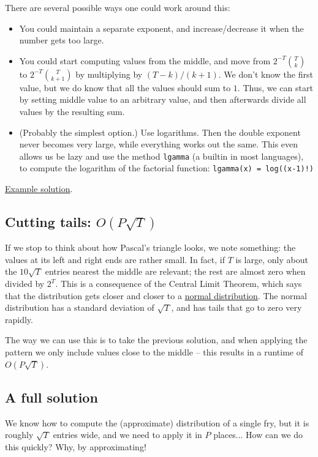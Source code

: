 \documentclass{article}
\begin{document}
There are several possible ways one could work around this:

\begin{itemize}
  \item You could maintain a separate exponent, and increase/decrease it when the number gets too large.
  \item You could start computing values from the middle, and move from $2^{-T}\binom{T}{k}$ to $2^{-T}\binom{T}{k+1}$
    by multiplying by $(T-k)/(k+1)$. We don't know the first value, but we do know that all the values should sum to $1$.
    Thus, we can start by setting middle value to an arbitrary value, and then afterwards divide all values by the resulting sum.
  \item (Probably the simplest option.) Use logarithms.
    Then the double exponent never becomes very large, while everything works out the same.
    This even allows us be lazy and use the method \texttt{lgamma} (a builtin in most languages),
    to compute the logarithm of the factorial function: \texttt{lgamma(x) = log((x-1)!)}
\end{itemize}

\href{https://github.com/nordicolympiad/nordic-olympiad-2018/blob/master/tasks/fries/submissions/precompute_sl.cpp}{Example solution}.

\subsection*{Cutting tails: $O(P\sqrt T)$}
If we stop to think about how Pascal's triangle looks, we note something: the values at its left and right ends are rather small.
In fact, if $T$ is large, only about the $10 \sqrt T$ entries nearest the middle are relevant; the rest are almost zero when divided by $2^T$.
This is a consequence of the Central Limit Theorem, which says that the distribution gets closer and closer to a \href{https://en.wikipedia.org/wiki/Normal_distribution}{normal distribution}.
The normal distribution has a standard deviation of $\sqrt T$, and has tails that go to zero very rapidly.

The way we can use this is to take the previous solution, and when applying the pattern we only include values close to the middle -- this results in a runtime of $O(P\sqrt T)$.

\subsection*{A full solution}
We know how to compute the (approximate) distribution of a single fry,
but it is roughly $\sqrt T$ entries wide, and we need to apply it in $P$ places...
How can we do this quickly? Why, by approximating!
\end{document}
